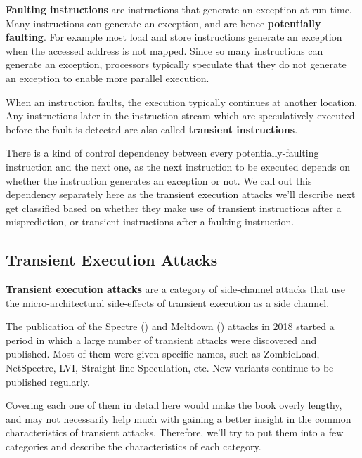 \documentclass[
  a4paper,
]{report}
\begin{document}
\textbf{\label{__index_entry_177}{Faulting
instructions}} are instructions that
generate an exception at run-time. Many instructions can generate an
exception, and are hence \textbf{potentially faulting}. For example most
load and store instructions generate an exception when the accessed
address is not mapped. Since so many instructions can generate an
exception, processors typically speculate that they do not generate an
exception to enable more parallel execution.

When an instruction faults, the execution typically continues at another
location. Any instructions later in the instruction stream which are
speculatively executed before the fault is detected are also called
\textbf{\label{__index_entry_178}{transient
instructions}}.

There is a kind of control dependency between every potentially-faulting
instruction and the next one, as the next instruction to be executed
depends on whether the instruction generates an exception or not. We
call out this dependency separately here as the transient execution
attacks we'll describe next get classified based on whether they make
use of transient instructions after a misprediction, or transient
instructions after a faulting instruction.

\subsection{Transient Execution
Attacks}\label{transient-execution-attacks-1}

\textbf{\label{__index_entry_179}{Transient execution
attacks}} are a category of
side-channel attacks that use the micro-architectural side-effects of
transient execution as a side channel.

The publication of the
\label{__index_entry_180}{Spectre}
() and
\label{__index_entry_181}{Meltdown}
() attacks in 2018 started a
period in which a large number of transient attacks were discovered and
published. Most of them were given specific names, such as ZombieLoad,
NetSpectre, LVI, Straight-line Speculation, etc. New variants continue
to be published regularly.

Covering each one of them in detail here would make the book overly
lengthy, and may not necessarily help much with gaining a better insight
in the common characteristics of transient attacks. Therefore, we'll try
to put them into a few categories and describe the characteristics of
each category.
\end{document}
